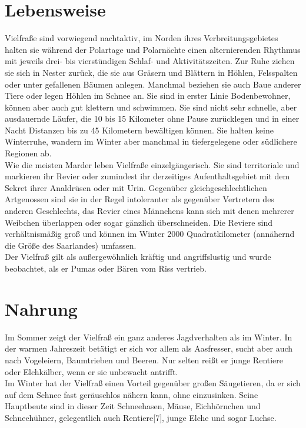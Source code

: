 \documentclass{scrartcl}
\begin{document}
\section{Lebensweise}
Vielfraße sind vorwiegend nachtaktiv, im Norden ihres Verbreitungsgebietes halten sie während der Polartage und Polarnächte einen alternierenden Rhythmus mit jeweils drei- bis vierstündigen Schlaf- und Aktivitätszeiten. Zur Ruhe ziehen sie sich in Nester zurück, die sie aus Gräsern und Blättern in Höhlen, Felsspalten oder unter gefallenen Bäumen anlegen. Manchmal beziehen sie auch Baue anderer Tiere oder legen Höhlen im Schnee an. Sie sind in erster Linie Bodenbewohner, können aber auch gut klettern und schwimmen. Sie sind nicht sehr schnelle, aber ausdauernde Läufer, die 10 bis 15 Kilometer ohne Pause zurücklegen und in einer Nacht Distanzen bis zu 45 Kilometern bewältigen können. Sie halten keine Winterruhe, wandern im Winter aber manchmal in tiefergelegene oder südlichere Regionen ab.
\\
Wie die meisten Marder leben Vielfraße einzelgängerisch. Sie sind territoriale und markieren ihr Revier oder zumindest ihr derzeitiges Aufenthaltsgebiet mit dem Sekret ihrer Analdrüsen oder mit Urin. Gegenüber gleichgeschlechtlichen Artgenossen sind sie in der Regel intoleranter als gegenüber Vertretern des anderen Geschlechts, das Revier eines Männchens kann sich mit denen mehrerer Weibchen überlappen oder sogar gänzlich überschneiden. Die Reviere sind verhältnismäßig groß und können im Winter 2000 Quadratkilometer (annähernd die Größe des Saarlandes) umfassen.
\\
Der Vielfraß gilt als außergewöhnlich kräftig und angriffslustig und wurde beobachtet, als er Pumas oder Bären vom Riss vertrieb. 

\section{Nahrung}
Im Sommer zeigt der Vielfraß ein ganz anderes Jagdverhalten als im Winter. In der warmen Jahreszeit betätigt er sich vor allem als Aasfresser, sucht aber auch nach Vogeleiern, Baumtrieben und Beeren. Nur selten reißt er junge Rentiere oder Elchkälber, wenn er sie unbewacht antrifft.
\\
Im Winter hat der Vielfraß einen Vorteil gegenüber großen Säugetieren, da er sich auf dem Schnee fast geräuschlos nähern kann, ohne einzusinken. Seine Hauptbeute sind in dieser Zeit Schneehasen, Mäuse, Eichhörnchen und Schneehühner, gelegentlich auch Rentiere[7], junge Elche und sogar Luchse. 
\end{document}
